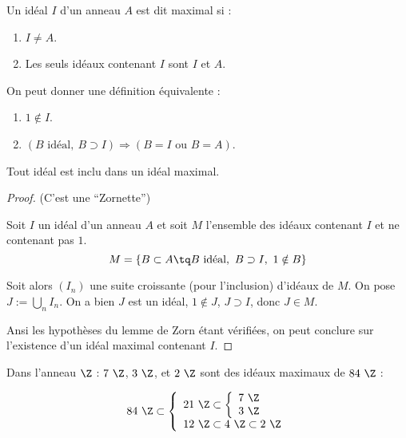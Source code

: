 \begin{defi}

 Un idéal $I$ d'un anneau $A$ est dit maximal si :
\begin{enumerate}
 \item $I \neq A$.
 \item Les seuls idéaux contenant $I$ sont $I$ et $A$.
\end{enumerate}
\end{defi}

\begin{example}[Remarque]
On peut donner une définition équivalente :
\begin{enumerate}
 \item $1 \notin I$.
 \item $(B \mbox{ idéal},\ B\supset I) \Rightarrow (B = I \mbox{ ou } B = A)$.
\end{enumerate}
\end{example}

\begin{theo}

 Tout idéal est inclu dans un idéal maximal.
\end{theo}

\begin{proof} (C'est une ``Zornette'')

Soit $I$ un idéal d'un anneau $A$ et soit $M$ l'ensemble des idéaux contenant
$I$ et ne contenant pas $1$.
\begin{displaymath}  M = \{B \subset A \tq B \mbox{ idéal},\ B \supset I,\ 1
\notin B\} \end{displaymath}

Soit alors $(I_n)$ une suite croissante (pour l'inclusion) d'idéaux de $M$. On
pose $J := \bigcup_n I_n$. On a bien $J$ est un idéal, $1 \notin J$, $J\supset
I$, donc $J \in M$.

Ansi les hypothèses du lemme de Zorn étant vérifiées, on peut conclure sur
l'existence d'un idéal maximal contenant $I$.
\end{proof}

\begin{example}[Exemple] 
  Dans l'anneau $\Z$ : $7\ \Z$, $3\ \Z$, et $2\ \Z$ sont des idéaux maximaux de
$84\ \Z$ :

\begin{equation*}
  84\ \Z \subset \left\lbrace
      \begin{array}{l}
      21\ \Z \subset \left\lbrace
         \begin{array}{l}
         7\ \Z  \\
         3\ \Z 
         \end{array}\right.\\
      12\ \Z \subset 4\ \Z \subset 2\ \Z 
      \end{array}\right.
\end{equation*}


\end{example}

